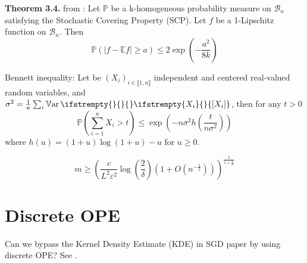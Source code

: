 \documentclass{report} %
\renewcommand{\epsilon}{\varepsilon}
\newcommand{\PP}[2]{\mathbb{P} \ifstrempty{#1}{}{_{#1}} \ifstrempty{#2}{}{\left[#2\right]}}
\newcommand{\Var}[2]{\operatorname{\mathbb{V}ar} \ifstrempty{#1}{}{_{#1}} \ifstrempty{#2}{}{\left[#2\right]}}
\newcommand{\1}{\mathds{1}} %
\newcommand{\intint}[2]{\llbracket #1,#2 \rrbracket} %
\theoremstyle{definition} %
\begin{document}
\textbf{Theorem 3.4.} from \cite{pemantle2011rayleighconcentration}: Let $\mathbb{P}$ be a k-homogeneous probability measure on $\mathcal{B}_{n}$ satisfying the Stochastic Covering Property (SCP). Let $f$ be a 1-Lipschitz function on $\mathcal{B}_{n}$. Then
$$
\mathbb{P}(\lvert f-\mathbb{E} f \rvert \geq a) \leq 2 \exp \left(-\frac{a^{2}}{8 k}\right)
$$

Bennett inequality: Let be $(X_i)_{i\in \intint{1}{n}}$ independent and centered real-valued random variables, and $\sigma^2 = \frac{1}{n}\sum_i \Var{}{X_i}$, then for any $t>0$
$$
\mathbb{P}\left(\sum_{i=1}^{n} X_{i}>t\right) \leq \exp \left(-n \sigma^{2} h\left(\frac{t}{n \sigma^{2}}\right)\right)
$$
where $h(u)=(1+u) \log (1+u)-u$ for $u \geq 0$.







$$m \geq \left( \frac{c}{L^{2}\varepsilon ^{2}}\log \left( \frac{2}{\delta }\right) \left( 1+O\left( n^{-\frac{1}{2}}\right) \right) \right) ^{\frac{1}{1+\frac{1}{d}}}$$

\section{Discrete OPE}
\begin{tcolorbox}
	Can we bypass the Kernel Density Estimate (KDE) in SGD paper by using discrete OPE? See \cite{gautschi2004ope}.

\end{tcolorbox}
\end{document}
